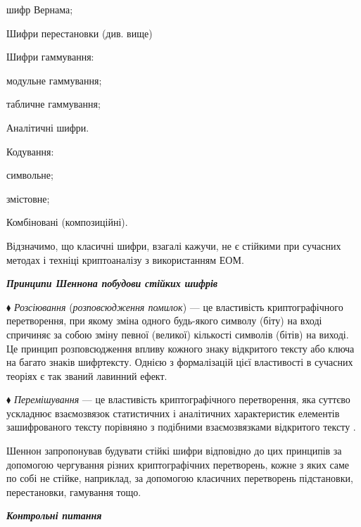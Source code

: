 {{{{{{{{{{{{{шифр Вернама;

Шифри перестановки (див. вище)

Шифри гаммування:

модульне гаммування;

табличне гаммування;


\bigskip

Аналітичні шифри.

Кодування:

символьне;

змістовне;

Комбіновані (композиційні).

Відзначимо,  що класичні  шифри, взагалі кажучи, не є стійкими при сучасних
методах і техніці криптоаналізу з використанням ЕОМ.


\bigskip

{\centering\bfseries\itshape
Принципи Шеннона побудови стійких  шифрів
\par}


\bigskip


\bigskip

$\blacklozenge$ \textit{Розсіювання} (\textit{розповсюдження помилок}) --- це
властивість криптографічного перетворення, при якому зміна одного будь-якого 
символу (біту) на вході спричиняє за собою зміну певної (великої)  кількості
символів (бітів) на виході. Це принцип розповсюдження впливу кожного знаку 
відкритого тексту або ключа на багато знаків шифртексту. Однією з формалізацій
цієї властивості  в сучасних теоріях є так званий лавинний ефект.

$\blacklozenge$ \textit{Перемішування }--- це властивість криптографічного
перетворення, яка суттєво ускладнює взаємозв{\textquotesingle}язок статистичних
 і аналітичних характеристик елементів зашифрованого тексту порівняно з
подібними взаємозв{\textquotesingle}язками відкритого тексту . 

 Шеннон запропонував будувати стійкі шифри відповідно до цих принципів за
допомогою чергування різних криптографічних перетворень, кожне з яких саме по
собі не стійке, наприклад, за допомогою класичних перетворень підстановки,
перестановки, гамування тощо.


\bigskip


\bigskip

{\centering\bfseries\itshape
Контрольні питання
\par}


\bigskip


\bigskip

}}}}}}}}}}}}}
